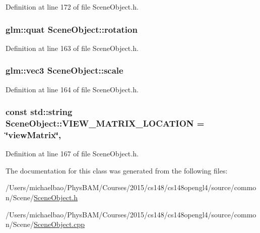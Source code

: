 Definition at line 172 of file Scene\+Object.\+h.

\hypertarget{class_scene_object_ae27376aaca87543a75b5a2cd0daf6e2f}{}
\subsubsection[{rotation}]{\setlength{\rightskip}{0pt plus 5cm}glm\+::quat Scene\+Object\+::rotation\hspace{0.3cm}{\ttfamily [protected]}}\label{class_scene_object_ae27376aaca87543a75b5a2cd0daf6e2f}


Definition at line 163 of file Scene\+Object.\+h.

\hypertarget{class_scene_object_a62c686b880fe4f58dec64a409e56de26}{}
\subsubsection[{scale}]{\setlength{\rightskip}{0pt plus 5cm}glm\+::vec3 Scene\+Object\+::scale\hspace{0.3cm}{\ttfamily [protected]}}\label{class_scene_object_a62c686b880fe4f58dec64a409e56de26}


Definition at line 164 of file Scene\+Object.\+h.

\hypertarget{class_scene_object_a1c129ecdd6bd8e2f34c713f5dd183361}{}
\subsubsection[{V\+I\+E\+W\+\_\+\+M\+A\+T\+R\+I\+X\+\_\+\+L\+O\+C\+A\+T\+I\+O\+N}]{\setlength{\rightskip}{0pt plus 5cm}const std\+::string Scene\+Object\+::\+V\+I\+E\+W\+\_\+\+M\+A\+T\+R\+I\+X\+\_\+\+L\+O\+C\+A\+T\+I\+O\+N = \char`\"{}view\+Matrix\char`\"{}\hspace{0.3cm}{\ttfamily [static]}, {\ttfamily [protected]}}\label{class_scene_object_a1c129ecdd6bd8e2f34c713f5dd183361}


Definition at line 167 of file Scene\+Object.\+h.



The documentation for this class was generated from the following files\+:\begin{DoxyCompactItemize}
\item 
/\+Users/michaelbao/\+Phys\+B\+A\+M/\+Courses/2015/cs148/cs148opengl4/source/common/\+Scene/\hyperlink{_scene_object_8h}{Scene\+Object.\+h}\item 
/\+Users/michaelbao/\+Phys\+B\+A\+M/\+Courses/2015/cs148/cs148opengl4/source/common/\+Scene/\hyperlink{_scene_object_8cpp}{Scene\+Object.\+cpp}\end{DoxyCompactItemize}
